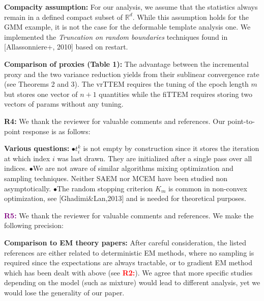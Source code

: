 \documentclass{article}
\begin{document}
\textbf{Compacity assumption:}  
For our analysis, we assume that the statistics always remain in a defined compact subset of $\mathbb{R}^d$.
While this assumption holds for the GMM example, it is not the case for the deformable template analysis one.
We implemented the \emph{Truncation on random boundaries} techniques found in [Allassonniere+, 2010] based on restart.

\textbf{Comparison of proxies (Table 1):} 
The advantage between the incremental proxy and the two variance reduction yields from their sublinear convergence rate (see Theorems 2 and 3).
The vrTTEM requires the tuning of the epoch length $m$ but stores one vector of $n+1$ quantities while the fiTTEM requires storing two vectors of params without any tuning.\vspace{-0.05in}

\textbf{\textcolor{yellow!50!black}{R4:}} We thank the reviewer for valuable comments and references. Our point-to-point response is as follows:\vspace{-0.05in}

\textbf{Various questions:} $\bullet$$t_i^k$ is not empty by construction since it stores the iteration at which index $i$ was last drawn. 
They are initialized after a single pass over all indices.
$\bullet$We are not aware of similar algorithms mixing optimization and sampling techniques. 
Neither SAEM nor MCEM have been studied non asymptotically.
$\bullet$The random stopping criterion $K_m$ is common in non-convex optimization, see [Ghadimi\&Lan,2013] and is needed for theoretical purposes.\vspace{-0.05in}


\textbf{\textcolor{purple}{R5:}} We thank the reviewer for valuable comments and references. We make the following precision:\vspace{-0.05in}

\textbf{Comparison to EM theory papers:}
After careful consideration, the listed references are either related to deterministic EM methods, where no sampling is required since the expectations are always tractable, or to gradient EM method which has been dealt with above (see \textbf{\textcolor{red}{R2:}}).
We agree that more specific studies depending on the model (such as mixture) would lead to different analysis, yet we would lose the generality of our paper.
\end{document}

